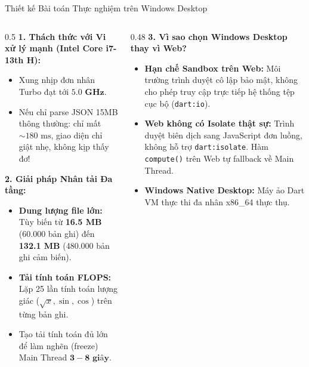 \documentclass[aspectratio=169, 10pt]{beamer}
\begin{document}
\begin{frame}{Thiết kế Bài toán Thực nghiệm trên Windows Desktop}
  \vspace{-0.25cm}
  \begin{columns}[c]
    \begin{column}{0.5\textwidth}
      \textbf{1. Thách thức với Vi xử lý mạnh (Intel Core i7-13th H):}
      \begin{itemize}
        \item Xung nhịp đơn nhân Turbo đạt tới $\mathbf{5.0\text{ GHz}}$.
        \item Nếu chỉ parse JSON 15MB thông thường: chỉ mất $\sim 180\text{ ms}$, giao diện chỉ giật nhẹ, không kịp thấy đơ!
      \end{itemize}
      \vspace{0.1cm}
      \textbf{2. Giải pháp Nhân tải Đa tầng:}
      \begin{itemize}
        \item \textbf{Dung lượng file lớn:} Tùy biến từ \textbf{16.5 MB} (60.000 bản ghi) đến \textbf{132.1 MB} (480.000 bản ghi cảm biến).
        \item \textbf{Tải tính toán FLOPS:} Lặp 25 lần tính toán lượng giác ($\sqrt{x}, \sin, \cos$) trên từng bản ghi.
        \item Tạo tải tính toán đủ lớn để làm nghẽn (freeze) Main Thread $\mathbf{3 - 8\text{ giây}}$.
      \end{itemize}
    \end{column}

    \begin{column}{0.48\textwidth}
      \textbf{3. Vì sao chọn Windows Desktop thay vì Web?}
      \begin{itemize}
        \item \textbf{Hạn chế Sandbox trên Web:} Môi trường trình duyệt cô lập bảo mật, không cho phép truy cập trực tiếp hệ thống tệp cục bộ (\texttt{dart:io}). 
        \item \textbf{Web không có Isolate thật sự:} Trình duyệt biên dịch sang JavaScript đơn luồng, không hỗ trợ \texttt{dart:isolate}. Hàm \texttt{compute()} trên Web tự fallback về Main Thread.
        \item \textbf{Windows Native Desktop:} Máy ảo Dart VM thực thi đa nhân x86\_64 thực thụ.
      \end{itemize}
    \end{column}
  \end{columns}
\end{frame}
\end{document}
